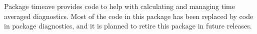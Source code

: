 Package timeave provides code to help with calculating and managing
time averaged diagnostics. Most of the code in this package has been
replaced by code in package diagnostics, and it is planned to retire 
this package in future releases.
